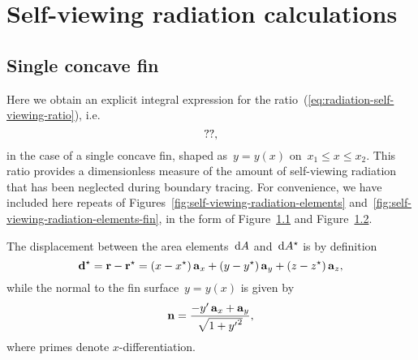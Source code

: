 \chapter{Self-viewing radiation calculations}
\label{ch:self-viewing}

\section{Single concave fin}
\label{sec:self-viewing.fin}

\begin{figure}
  \label{fig:self-viewing-radiation-elements-appendix}
\end{figure}

\begin{figure}[t]
  \label{fig:self-viewing-radiation-elements-fin-appendix}
\end{figure}

Here we obtain an explicit integral expression
for the ratio~(\ref{eq:radiation-self-viewing-ratio}),
i.e.
\begin{equation}
  \usecontent{eq:radiation-self-viewing-ratio},
  \label{eq:radiation-self-viewing-ratio-appendix}
\end{equation}
in the case of a single concave fin,
shaped as~$y = y (x)$ on~$x_1 \le x \le x_2$.
This ratio provides a dimensionless measure
of the amount of self-viewing radiation
that has been neglected during boundary tracing.
For convenience, we have included here
repeats of Figures~\ref{fig:self-viewing-radiation-elements}
and~\ref{fig:self-viewing-radiation-elements-fin},
in the form of Figure~\ref{fig:self-viewing-radiation-elements-appendix}
and Figure~\ref{fig:self-viewing-radiation-elements-fin-appendix}.

The displacement between the area elements~$\mathop{}\!\mathrm{d} A$ and~$\mathop{}\!\mathrm{d} A^\star$ is
by definition
\begin{equation}
  \boldsymbol{\mathbf{d}}^\star
    =
      \boldsymbol{\mathbf{r}} - \boldsymbol{\mathbf{r}}^\star \\
    =
      (x - x^\star) \mathop{}\!\boldsymbol{\mathbf{a}}_{x}
        +
      (y - y^\star) \mathop{}\!\boldsymbol{\mathbf{a}}_{y}
        +
      (z - z^\star) \mathop{}\!\boldsymbol{\mathbf{a}}_{z},
  \label{eq:radiation-self-viewing-displacement-appendix}
\end{equation}
while the normal to the fin surface~$y = y (x)$ is given by
\begin{equation}
  \mathop{}\!\boldsymbol{\mathbf{n}} =
    \frac{
      -y' \mathop{}\!\boldsymbol{\mathbf{a}}_{x} + \mathop{}\!\boldsymbol{\mathbf{a}}_{y}
    }{
      \sqrt{1 + {y'}^2}
    },
  \label{eq:radiation-self-viewing-normal-vector}
\end{equation}
where primes denote $x$-differentiation.


